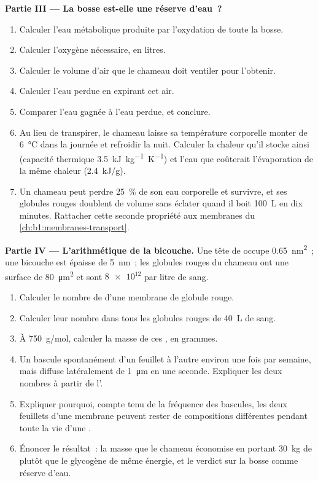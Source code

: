 \begin{problem}
\medskip
\noindent\textbf{Partie III --- La bosse est-elle une réserve d'eau~?}
\begin{enumerate}[resume]
  \item Calculer l'eau métabolique produite par l'oxydation de toute la
        bosse.
  \item Calculer l'oxygène nécessaire, en litres.
  \item Calculer le volume d'air que le chameau doit ventiler pour
        l'obtenir.
  \item Calculer l'eau perdue en expirant cet air.
  \item Comparer l'eau gagnée à l'eau perdue, et conclure.
  \item Au lieu de transpirer, le chameau laisse sa température
        corporelle monter de \qty{6}{\celsius} dans la journée et
        refroidir la nuit. Calculer la chaleur qu'il stocke ainsi
        (capacité thermique \qty{3.5}{kJ.kg^{-1}.K^{-1}}) et l'eau que
        coûterait l'évaporation de la même chaleur (\qty{2.4}{kJ/g}).
  \item Un chameau peut perdre \qty{25}{\%} de son eau corporelle et
        survivre, et ses globules rouges doublent de volume sans éclater
        quand il boit \qty{100}{L} en dix minutes. Rattacher cette
        seconde propriété aux membranes du
        \cref{ch:b1:membranes-transport}.
\end{enumerate}

\medskip
\noindent\textbf{Partie IV --- L'arithmétique de la bicouche.}
Une tête de  occupe \qty{0.65}{nm^2}~; une bicouche est
épaisse de \qty{5}{nm}~; les globules rouges du chameau ont une surface
de \qty{80}{\micro m^2} et sont $\num{8e12}$ par litre de sang.
\begin{enumerate}[resume]
  \item Calculer le nombre de  d'une membrane de globule
        rouge.
  \item Calculer leur nombre dans tous les globules rouges de
        \qty{40}{L} de sang.
  \item À \qty{750}{g/mol}, calculer la masse de ces , en grammes.
  \item Un  bascule spontanément d'un feuillet à l'autre
        environ une fois par semaine, mais diffuse latéralement de
        \qty{1}{\micro m} en une seconde. Expliquer les deux nombres à
        partir de l'.
  \item Expliquer pourquoi, compte tenu de la fréquence des bascules,
        les deux feuillets d'une membrane peuvent rester de compositions
        différentes pendant toute la vie d'une .
  \item Énoncer le résultat~: la masse que le chameau économise en
        portant \qty{30}{kg} de  plutôt que le glycogène de même
        énergie, et le verdict sur la bosse comme réserve d'eau.
\end{enumerate}
\end{problem}
